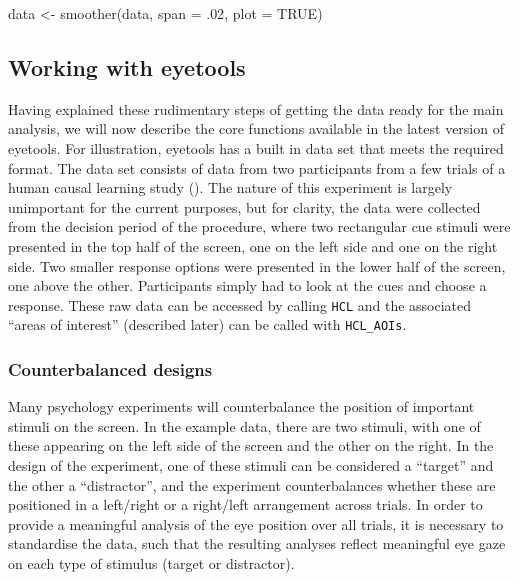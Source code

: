 \documentclass[
  man,
  floatsintext,
  longtable,
  nolmodern,
  notxfonts,
  notimes,
  colorlinks=true,linkcolor=blue,citecolor=blue,urlcolor=blue]{apa7}
\newenvironment{Shaded}{\begin{snugshade}}{\end{snugshade}}
\newcommand{\AttributeTok}[1]{\textcolor[rgb]{0.40,0.45,0.13}{#1}}
\newcommand{\ConstantTok}[1]{\textcolor[rgb]{0.56,0.35,0.01}{#1}}
\newcommand{\DecValTok}[1]{\textcolor[rgb]{0.68,0.00,0.00}{#1}}
\newcommand{\FunctionTok}[1]{\textcolor[rgb]{0.28,0.35,0.67}{#1}}
\newcommand{\NormalTok}[1]{\textcolor[rgb]{0.00,0.23,0.31}{#1}}
\newcommand{\OtherTok}[1]{\textcolor[rgb]{0.00,0.23,0.31}{#1}}
\begin{document}
\begin{Shaded}
\begin{Highlighting}[]
\NormalTok{data }\OtherTok{\textless{}{-}} \FunctionTok{smoother}\NormalTok{(data,}
                 \AttributeTok{span =}\NormalTok{ .}\DecValTok{02}\NormalTok{,}
                 \AttributeTok{plot =} \ConstantTok{TRUE}\NormalTok{)}
\end{Highlighting}
\end{Shaded}

\subsection{Working with eyetools}\label{working-with-eyetools}

Having explained these rudimentary steps of getting the data ready for
the main analysis, we will now describe the core functions available in
the latest version of eyetools. For illustration, eyetools has a built
in data set that meets the required format. The data set consists of
data from two participants from a few trials of a human causal learning
study (). The nature of
this experiment is largely unimportant for the current purposes, but for
clarity, the data were collected from the decision period of the
procedure, where two rectangular cue stimuli were presented in the top
half of the screen, one on the left side and one on the right side. Two
smaller response options were presented in the lower half of the screen,
one above the other. Participants simply had to look at the cues and
choose a response. These raw data can be accessed by calling
\texttt{HCL} and the associated ``areas of interest'' (described later)
can be called with \texttt{HCL\_AOIs}.

\subsubsection{Counterbalanced designs}\label{counterbalanced-designs}

Many psychology experiments will counterbalance the position of
important stimuli on the screen. In the example data, there are two
stimuli, with one of these appearing on the left side of the screen and
the other on the right. In the design of the experiment, one of these
stimuli can be considered a ``target'' and the other a ``distractor'',
and the experiment counterbalances whether these are positioned in a
left/right or a right/left arrangement across trials. In order to
provide a meaningful analysis of the eye position over all trials, it is
necessary to standardise the data, such that the resulting analyses
reflect meaningful eye gaze on each type of stimulus (target or
distractor).
\end{document}
